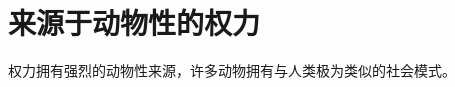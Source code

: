 \documentclass[main.tex]{subfiles}
\begin{document}
\section{来源于动物性的权力}
权力拥有强烈的动物性来源，许多动物拥有与人类极为类似的社会模式。
\end{document}
